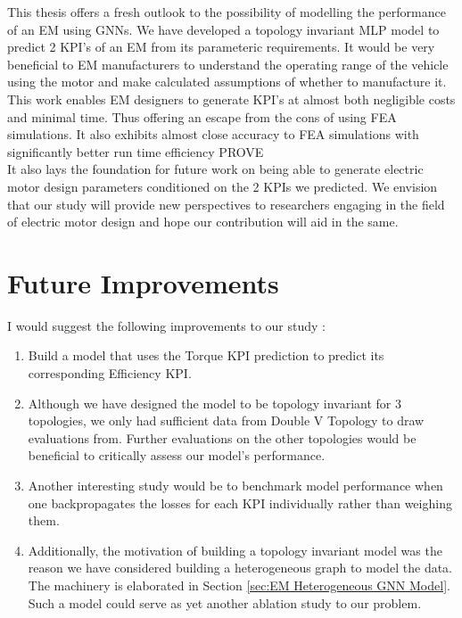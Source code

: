 \documentclass{report} %
\begin{document}
This thesis offers a fresh outlook to the possibility of modelling the performance of an \ac{EM} using \ac{GNN}s.
We have developed a topology invariant \ac{MLP} model to predict 2 \ac{KPI}'s of an \ac{EM} from its parameteric requirements. 
It would be very beneficial to \ac{EM} manufacturers to understand the operating range of the vehicle using the motor and make calculated assumptions of whether to manufacture it.\\
This work enables \ac{EM} designers to generate \ac{KPI}'s at almost both negligible costs and minimal time.
Thus offering an escape from the cons of using \ac{FEA} simulations. It also exhibits almost close accuracy to \ac{FEA} simulations with significantly better run time efficiency PROVE\\
It also lays the foundation for future work on being able to generate electric motor design parameters conditioned on the 2 KPIs we predicted.
We envision that our study will provide new perspectives to researchers engaging in the field of electric motor design and hope our contribution will aid in the same.\\
\section{Future Improvements}\label{sec:Future Improvements}

I would suggest the following improvements to our study : 

\begin{enumerate}
    \item Build a model that uses the Torque \ac{KPI} prediction to predict its corresponding Efficiency \ac{KPI}. 
    \item Although we have designed the model to be topology invariant for 3 topologies, we only had sufficient data from Double V Topology to draw evaluations from.
    Further evaluations on the other topologies would be beneficial to critically assess our model's performance.
    \item Another interesting study would be to benchmark model performance when one backpropagates the losses for each \ac{KPI} individually rather than weighing them.
    \item Additionally, the motivation of building a topology invariant model was the reason we have considered building a heterogeneous graph to model the data. The machinery is elaborated in Section \ref{sec:EM Heterogeneous GNN Model}.
    Such a model could serve as yet another ablation study to our problem.
\end{enumerate}
\end{document}
